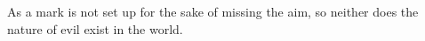 As a mark  is not set up for the  sake of missing the aim, so  neither does the
nature of evil exist in the world.

